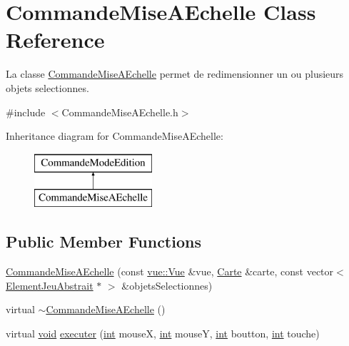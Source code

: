 \hypertarget{class_commande_mise_a_echelle}{\section{Commande\-Mise\-A\-Echelle Class Reference}
\label{class_commande_mise_a_echelle}
}


La classe \hyperlink{class_commande_mise_a_echelle}{Commande\-Mise\-A\-Echelle} permet de redimensionner un ou plusieurs objets selectionnes.  




{\ttfamily \#include $<$Commande\-Mise\-A\-Echelle.\-h$>$}

Inheritance diagram for Commande\-Mise\-A\-Echelle\-:\begin{figure}[H]
\begin{center}
\leavevmode
\includegraphics[height=2.000000cm]{class_commande_mise_a_echelle}
\end{center}
\end{figure}
\subsection*{Public Member Functions}
\begin{DoxyCompactItemize}
\item 
\hyperlink{class_commande_mise_a_echelle_a9b855e25dc10ed0893a8de09d305b436}{Commande\-Mise\-A\-Echelle} (const \hyperlink{classvue_1_1_vue}{vue\-::\-Vue} \&vue, \hyperlink{class_carte}{Carte} \&carte, const vector$<$ \hyperlink{class_element_jeu_abstrait}{Element\-Jeu\-Abstrait} $\ast$ $>$ \&objets\-Selectionnes)
\item 
virtual \hyperlink{class_commande_mise_a_echelle_a7cb0c5c9155f30b96ee3b8a82e014fd7}{$\sim$\-Commande\-Mise\-A\-Echelle} ()
\item 
virtual \hyperlink{wglew_8h_aeea6e3dfae3acf232096f57d2d57f084}{void} \hyperlink{class_commande_mise_a_echelle_a03aabe2e5d3a20928b041cfe5595715b}{executer} (\hyperlink{wglew_8h_a500a82aecba06f4550f6849b8099ca21}{int} mouse\-X, \hyperlink{wglew_8h_a500a82aecba06f4550f6849b8099ca21}{int} mouse\-Y, \hyperlink{wglew_8h_a500a82aecba06f4550f6849b8099ca21}{int} boutton, \hyperlink{wglew_8h_a500a82aecba06f4550f6849b8099ca21}{int} touche)
\end{DoxyCompactItemize}
